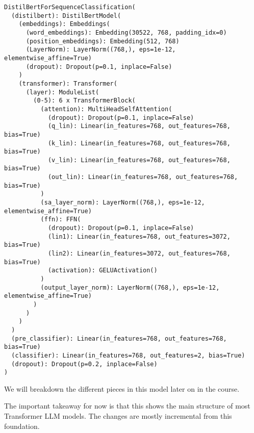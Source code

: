 \documentclass[
  letterpaper,
  DIV=11,
  numbers=noendperiod]{scrartcl}
\begin{document}
\begin{verbatim}
DistilBertForSequenceClassification(
  (distilbert): DistilBertModel(
    (embeddings): Embeddings(
      (word_embeddings): Embedding(30522, 768, padding_idx=0)
      (position_embeddings): Embedding(512, 768)
      (LayerNorm): LayerNorm((768,), eps=1e-12, elementwise_affine=True)
      (dropout): Dropout(p=0.1, inplace=False)
    )
    (transformer): Transformer(
      (layer): ModuleList(
        (0-5): 6 x TransformerBlock(
          (attention): MultiHeadSelfAttention(
            (dropout): Dropout(p=0.1, inplace=False)
            (q_lin): Linear(in_features=768, out_features=768, bias=True)
            (k_lin): Linear(in_features=768, out_features=768, bias=True)
            (v_lin): Linear(in_features=768, out_features=768, bias=True)
            (out_lin): Linear(in_features=768, out_features=768, bias=True)
          )
          (sa_layer_norm): LayerNorm((768,), eps=1e-12, elementwise_affine=True)
          (ffn): FFN(
            (dropout): Dropout(p=0.1, inplace=False)
            (lin1): Linear(in_features=768, out_features=3072, bias=True)
            (lin2): Linear(in_features=3072, out_features=768, bias=True)
            (activation): GELUActivation()
          )
          (output_layer_norm): LayerNorm((768,), eps=1e-12, elementwise_affine=True)
        )
      )
    )
  )
  (pre_classifier): Linear(in_features=768, out_features=768, bias=True)
  (classifier): Linear(in_features=768, out_features=2, bias=True)
  (dropout): Dropout(p=0.2, inplace=False)
)
\end{verbatim}

We will breakdown the different pieces in this model later on in the
course.

The important takeaway for now is that this shows the main structure of
most Transformer LLM models. The changes are mostly incremental from
this foundation.
\end{document}
